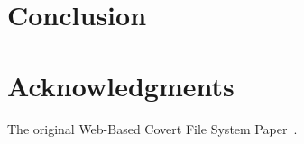 \documentclass[12pt,journal,compsoc]{IEEEtran}
\begin{document}
\section{Conclusion}

\section{Acknowledgments}

The original Web-Based Covert File System Paper~\cite{Baliga2007}.


\end{document}
